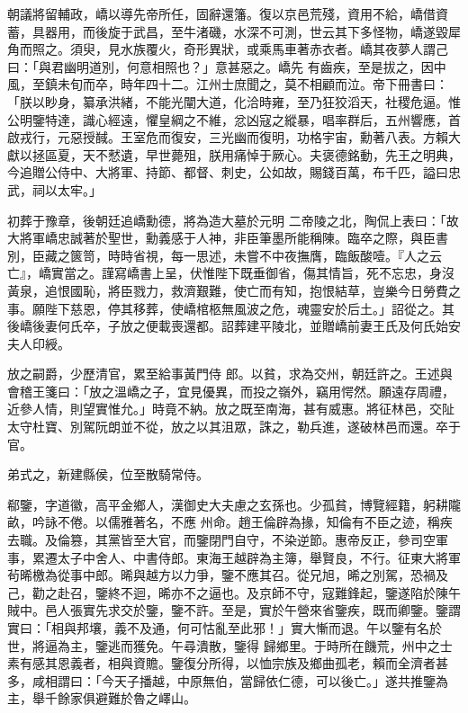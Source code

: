 \begin{pinyinscope}
 朝議將留輔政，嶠以導先帝所任，固辭還籓。復以京邑荒殘，資用不給，嶠借資蓄，具器用，而後旋于武昌，至牛渚磯，水深不可測，世云其下多怪物，嶠遂毀犀角而照之。須臾，見水族覆火，奇形異狀，或乘馬車著赤衣者。嶠其夜夢人謂己曰：「與君幽明道別，何意相照也？」意甚惡之。嶠先
 有齒疾，至是拔之，因中風，至鎮未旬而卒，時年四十二。江州士庶聞之，莫不相顧而泣。帝下冊書曰：「朕以眇身，纂承洪緒，不能光闡大道，化洽時雍，至乃狂狡滔天，社稷危逼。惟公明鑒特達，識心經遠，懼皇綱之不維，忿凶寇之縱暴，唱率群后，五州響應，首啟戎行，元惡授馘。王室危而復安，三光幽而復明，功格宇宙，勳著八表。方賴大獻以拯區夏，天不憖遺，早世薨殂，朕用痛悼于厥心。夫褒德銘動，先王之明典，今追贈公侍中、大將軍、持節、都督、刺史，公如故，賜錢百萬，布千匹，謚曰忠武，祠以太牢。」



 初葬于豫章，後朝廷追嶠勳德，將為造大墓於元明
 二帝陵之北，陶侃上表曰：「故大將軍嶠忠誠著於聖世，勳義感于人神，非臣筆墨所能稱陳。臨卒之際，與臣書別，臣藏之篋笥，時時省視，每一思述，未嘗不中夜撫膺，臨飯酸噎。『人之云亡』，嶠實當之。謹寫嶠書上呈，伏惟陛下既垂御省，傷其情旨，死不忘忠，身沒黃泉，追恨國恥，將臣戮力，救濟艱難，使亡而有知，抱恨結草，豈樂今日勞費之事。願陛下慈恩，停其移葬，使嶠棺柩無風波之危，魂靈安於后土。」詔從之。其後嶠後妻何氏卒，子放之便載喪還都。詔葬建平陵北，並贈嶠前妻王氏及何氏始安夫人印綬。



 放之嗣爵，少歷清官，累至給事黃門侍
 郎。以貧，求為交州，朝廷許之。王述與會稽王箋曰：「放之溫嶠之子，宜見優異，而投之嶺外，竊用愕然。願遠存周禮，近參人情，則望實惟允。」時竟不納。放之既至南海，甚有威惠。將征林邑，交阯太守杜寶、別駕阮朗並不從，放之以其沮眾，誅之，勒兵進，遂破林邑而還。卒于官。



 弟式之，新建縣侯，位至散騎常侍。



 郗鑒，字道徽，高平金鄉人，漢御史大夫慮之玄孫也。少孤貧，博覽經籍，躬耕隴畝，吟詠不倦。以儒雅著名，不應
 州命。趙王倫辟為掾，知倫有不臣之迹，稱疾去職。及倫篡，其黨皆至大官，而鑒閉門自守，不染逆節。惠帝反正，參司空軍事，累遷太子中舍人、中書侍郎。東海王越辟為主簿，舉賢良，不行。征東大將軍茍晞檄為從事中郎。晞與越方以力爭，鑒不應其召。從兄旭，晞之別駕，恐禍及己，勸之赴召，鑒終不迴，晞亦不之逼也。及京師不守，寇難鋒起，鑒遂陷於陳午賊中。邑人張實先求交於鑒，鑒不許。至是，實於午營來省鑒疾，既而卿鑒。鑒謂實曰：「相與邦壤，義不及通，何可怙亂至此邪！」實大慚而退。午以鑒有名於世，將逼為主，鑒逃而獲免。午尋潰散，鑒得
 歸鄉里。于時所在饑荒，州中之士素有感其恩義者，相與資贍。鑒復分所得，以恤宗族及鄉曲孤老，賴而全濟者甚多，咸相謂曰：「今天子播越，中原無伯，當歸依仁德，可以後亡。」遂共推鑒為主，舉千餘家俱避難於魯之嶧山。




\end{pinyinscope}
